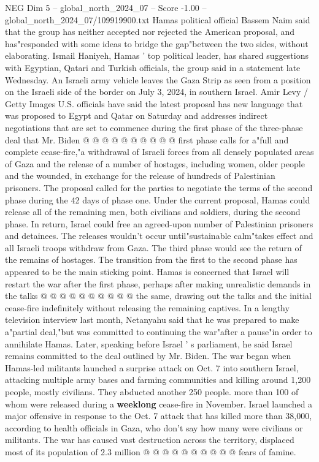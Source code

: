 \begin{textsample}{NEG Dim 5 – global\_north\_2024\_07 – Score -1.00 – global\_north\_2024\_07/109919900.txt}
Hamas political official Bassem Naim said that the group has neither accepted nor rejected the American proposal, and has"responded with some ideas to bridge the gap"between the two sides, without elaborating.
Ismail Haniyeh, Hamas ' top political leader, has shared suggestions with Egyptian, Qatari and Turkish officials, the group said in a statement late Wednesday.
An Israeli army vehicle leaves the Gaza Strip as seen from a position on the Israeli side of the border on July 3, 2024, in southern Israel.
Amir Levy / Getty Images U.S. officials have said the latest proposal has new language that was proposed to Egypt and Qatar on Saturday and addresses indirect negotiations that are set to commence during the first phase of the three-phase deal that Mr.
Biden @ @ @ @ @ @ @ @ @ @ first phase calls for a"full and complete cease-fire,"a withdrawal of Israeli forces from all densely populated areas of Gaza and the release of a number of hostages, including women, older people and the wounded, in exchange for the release of hundreds of Palestinian prisoners.
The proposal called for the parties to negotiate the terms of the second phase during the 42 days of phase one.
Under the current proposal, Hamas could release all of the remaining men, both civilians and soldiers, during the second phase.
In return, Israel could free an agreed-upon number of Palestinian prisoners and detainees.
The releases wouldn't occur until"sustainable calm"takes effect and all Israeli troops withdraw from Gaza.
The third phase would see the return of the remains of hostages.
The transition from the first to the second phase has appeared to be the main sticking point.
Hamas is concerned that Israel will restart the war after the first phase, perhaps after making unrealistic demands in the talks @ @ @ @ @ @ @ @ @ @ the same, drawing out the talks and the initial cease-fire indefinitely without releasing the remaining captives.
In a lengthy television interview last month, Netanyahu said that he was prepared to make a"partial deal,"but was committed to continuing the war"after a pause"in order to annihilate Hamas.
Later, speaking before Israel ' s parliament, he said Israel remains committed to the deal outlined by Mr.
Biden.
The war began when Hamas-led militants launched a surprise attack on Oct. 7 into southern Israel, attacking multiple army bases and farming communities and killing around 1,200 people, mostly civilians.
They abducted another 250 people. more than 100 of whom were released during a \textbf{weeklong} cease-fire in November.
Israel launched a major offensive in response to the Oct. 7 attack that has killed more than 38,000, according to health officials in Gaza, who don't say how many were civilians or militants.
The war has caused vast destruction across the territory, displaced most of its population of 2.3 million @ @ @ @ @ @ @ @ @ @ fears of famine.

\end{textsample}
